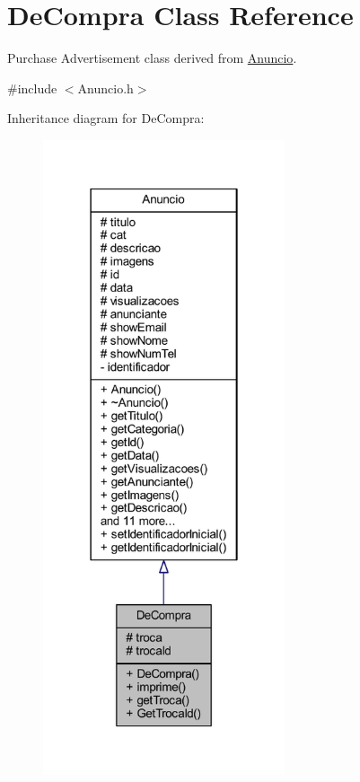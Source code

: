 \hypertarget{class_de_compra}{}\section{De\+Compra Class Reference}
\label{class_de_compra}


Purchase Advertisement class derived from \hyperlink{class_anuncio}{Anuncio}.  




{\ttfamily \#include $<$Anuncio.\+h$>$}



Inheritance diagram for De\+Compra\+:\nopagebreak
\begin{figure}[H]
\begin{center}
\leavevmode
\includegraphics[width=202pt]{class_de_compra__inherit__graph}
\end{center}
\end{figure}



